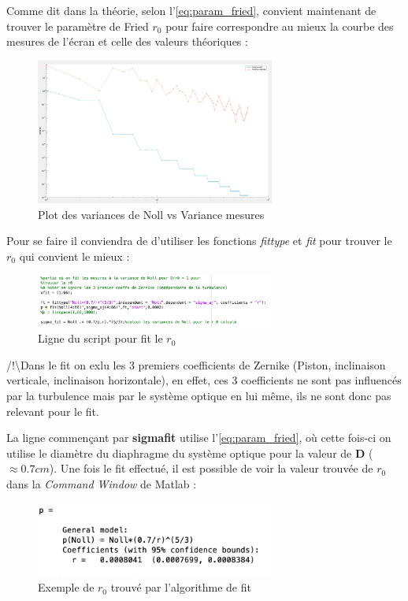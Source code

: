 \newpage
Comme dit dans la théorie, selon l'\autoref{eq:param_fried}, convient maintenant de trouver le paramètre de Fried $r_0$
pour faire correspondre au mieux la courbe des mesures de l'écran et celle des valeurs théoriques :
\begin{figure}[H]
    \centering
    \includegraphics[width = 0.7\textwidth]{assets/figures/mesures/Noll_vs_mesure.png}
    \caption{Plot des variances de Noll vs Variance mesures}
\end{figure}

Pour se faire il conviendra de d'utiliser les fonctions \textit{fittype} et \textit{fit} pour trouver le $r_0$ qui convient le mieux :
\begin{figure}[H]
    \centering
    \includegraphics[width = 0.7\textwidth]{assets/figures/mesures/matlab_fit.png}
    \caption{Ligne du script pour fit le $r_0$}
\end{figure}
\color{red}/!\textbackslash \color{black}Dans le fit on exlu les 3 premiers coefficients de Zernike (Piston, inclinaison verticale, inclinaison horizontale),
en effet, ces 3 coefficients ne sont pas influencés par la turbulence mais par le système optique en lui même, ils ne sont donc pas relevant pour le fit.

La ligne commençant par \textbf{sigma\textunderscore fit} utilise l'\autoref{eq:param_fried}, où cette fois-ci on utilise le diamètre du diaphragme du système optique pour la
valeur de \textbf{D} ($\approx0.7 cm$). Une fois le fit effectué, il est possible de voir la valeur trouvée de $r_0$ dans la \textit{Command Window} de Matlab :
\begin{figure}[H]
    \centering
    \includegraphics[width = 0.7\textwidth]{assets/figures/mesures/fit_r_resultat.png}
    \caption{Exemple de $r_0$ trouvé par l'algorithme de fit}
\end{figure}

